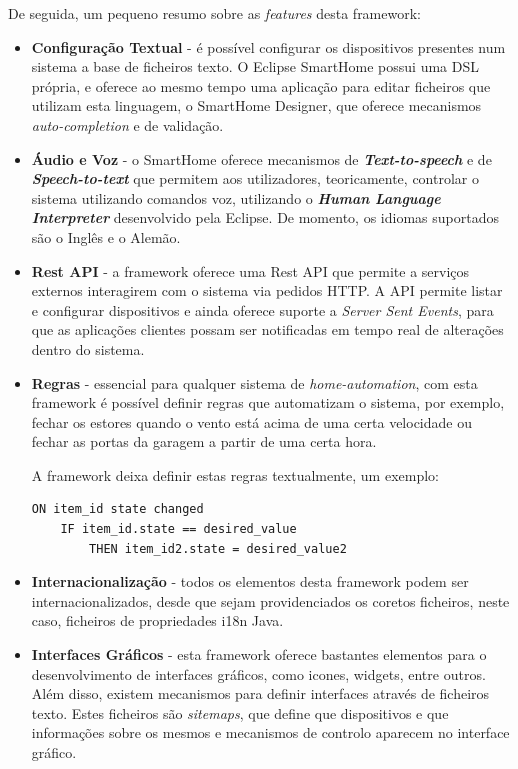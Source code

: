 De seguida, um pequeno resumo sobre as \textit{features} desta framework:

\begin{itemize}
\item \textbf{Configuração Textual} - é possível configurar os dispositivos presentes num sistema a base de ficheiros texto. O Eclipse SmartHome possui uma DSL própria, e oferece ao mesmo tempo uma aplicação para editar ficheiros que utilizam esta linguagem, o SmartHome Designer, que oferece mecanismos \textit{auto-completion} e de validação.

\item \textbf{Áudio e Voz} - o SmartHome oferece mecanismos de \textbf{\textit{Text-to-speech}} e de \textbf{\textit{Speech-to-text}} que permitem aos utilizadores, teoricamente, controlar o sistema utilizando comandos voz, utilizando o \textbf{\textit{Human Language Interpreter}} desenvolvido pela Eclipse. De momento, os idiomas suportados são o Inglês e o Alemão.

\item \textbf{Rest API} - a framework oferece uma Rest API que permite a serviços externos interagirem com o sistema via pedidos HTTP. A API permite listar e configurar dispositivos e ainda oferece suporte a \textit{Server Sent Events}\cite{sse}, para que as aplicações clientes possam ser notificadas em tempo real de alterações dentro do sistema.

\item \textbf{Regras} - essencial para qualquer sistema de \textit{home-automation}, com esta framework é possível definir regras que automatizam o sistema, por exemplo, fechar os estores quando o vento está acima de uma certa velocidade ou fechar as portas da garagem a partir de uma certa hora.

\newpage

A framework deixa definir estas regras textualmente, um exemplo:

\begin{Verbatim}
ON item_id state changed 
    IF item_id.state == desired_value 
        THEN item_id2.state = desired_value2 
\end{Verbatim}

\item \textbf{Internacionalização} - todos os elementos desta framework podem ser internacionalizados, desde que sejam providenciados os coretos ficheiros, neste caso, ficheiros de propriedades i18n Java.

\item \textbf{Interfaces Gráficos} - esta framework oferece bastantes elementos para o desenvolvimento de interfaces gráficos, como icones, widgets, entre outros. Além disso, existem mecanismos para definir interfaces através de ficheiros texto. Estes ficheiros são \textit{sitemaps}, que define que dispositivos e que informações sobre os mesmos e mecanismos de controlo aparecem no interface gráfico.


\end{itemize}
